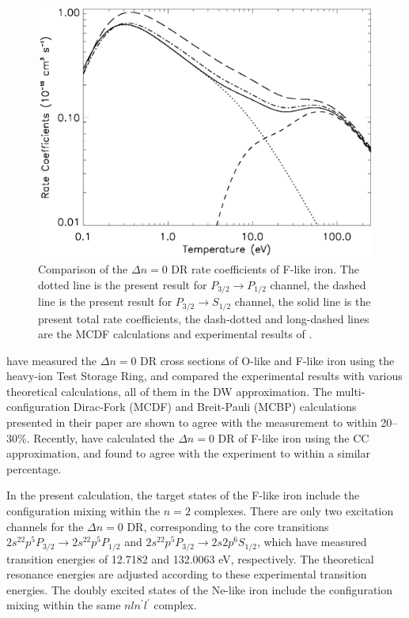 \documentclass[preprint, floatfix, pra, showpacs, showkeys]{revtex4}
\begin{document}
\begin{figure}
\includegraphics[width=5in]{rate.eps}
\caption{\label{fig_rate} Comparison of the $\Delta n = 0$ DR rate
coefficients of F-like iron. The dotted line is the present result for
$P_{3/2}\to P_{1/2}$ channel, the dashed line is the present result for
$P_{3/2}\to S_{1/2}$ channel, the solid line is the present total rate
coefficients, the dash-dotted and long-dashed lines are the MCDF calculations
and experimental results of \textcite{savin99}.}
\end{figure}

\textcite{savin99} have measured the $\Delta n = 0$ DR cross sections of O-like
and F-like iron 
using the heavy-ion Test Storage Ring, and compared the experimental results
with various theoretical calculations, all of them in the DW approximation. The
multi-configuration Dirac-Fork (MCDF) and Breit-Pauli (MCBP) calculations
presented in their paper are shown to agree with the measurement to within
20--30\%. Recently, \textcite{pradhan01} have calculated the $\Delta n = 0$ DR
of F-like iron using the CC approximation, and found to agree with the
experiment to within a similar percentage. 

In the present calculation, the target states of the F-like iron include the 
configuration mixing within the $n = 2$ complexes. There are only
two excitation channels for the $\Delta n = 0$ DR, corresponding to the core
transitions $2s^22p^5 P_{3/2}\to 2s^22p^5 P_{1/2}$ and $2s^22p^5 P_{3/2}\to
2s2p^6 S_{1/2}$, which have measured transition energies of 12.7182 and
132.0063 eV, respectively. The theoretical resonance energies are adjusted 
according to these experimental transition energies. The doubly excited states
of the Ne-like iron include the configuration mixing within the same
$nln^\prime l^\prime$ complex. 
\end{document}
